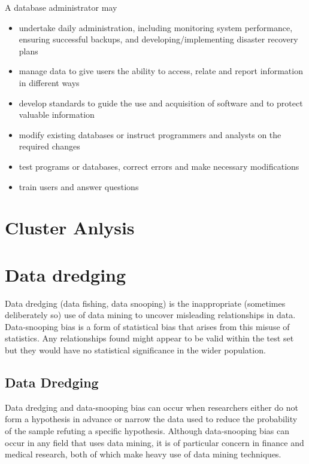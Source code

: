 \documentclass[12pt]{article}
\begin{document}
A database administrator may
\begin{itemize}
\item undertake daily administration, including monitoring system performance, ensuring successful backups, and developing/implementing disaster recovery plans
\item manage data to give users the ability to access, relate and report information in different ways
\item develop standards to guide the use and acquisition of software and to protect valuable information
\item modify existing databases or instruct programmers and analysts on the required changes
\item test programs or databases, correct errors and make necessary modifications
\item train users and answer questions
\end{itemize}


\section{Cluster Anlysis}

\section{Data dredging}

Data dredging (data fishing, data snooping) is the inappropriate (sometimes deliberately so) use of data mining to uncover misleading relationships in data. Data-snooping bias is a form of statistical bias that arises from this misuse of statistics. Any relationships found might appear to be valid within the test set but they would have no statistical significance in the wider population.
\subsection{Data Dredging}
Data dredging and data-snooping bias can occur when researchers either do not form a hypothesis in advance or narrow the data used to reduce the probability of the sample refuting a specific hypothesis. Although data-snooping bias can occur in any field that uses data mining, it is of particular concern in finance and medical research, both of which make heavy use of data mining techniques.
\end{document}
